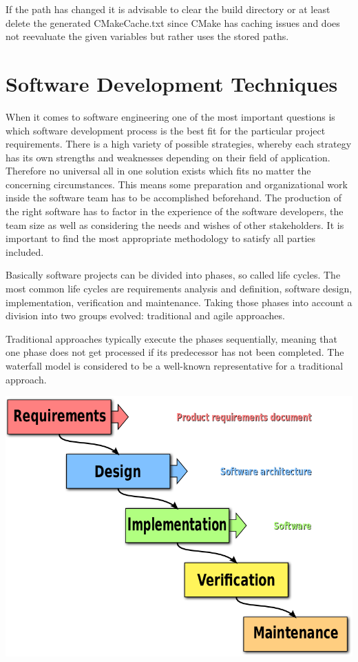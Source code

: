 {If the path has changed it is advisable to clear the build directory or
at least delete the generated CMakeCache.txt since CMake has caching
issues and does not reevaluate the given variables but rather uses the
stored paths. }

\hypertarget{h.totk00jqaso2}{\section{\texorpdfstring{{Software
Development
}{Techniques}}{Software Development Techniques}}\label{h.totk00jqaso2}}

{When it comes to software engineering one of the most important
questions is which software development process is the best fit for the
particular project requirements. There is a high variety of possible
strategies, whereby each strategy has its own strengths and weaknesses
depending on their field of application. Therefore no universal all in
one solution exists which fits no matter the concerning circumstances.
This means some preparation and organizational work inside the software
team has to be accomplished beforehand. The production of the right
software has to factor in the experience of the software developers, the
team size as well as considering the needs and wishes of other
stakeholders. It is important to find the most appropriate methodology
to satisfy all parties included.}

{Basically software projects can be divided into phases, so called life
cycles. The most common life cycles are requirements analysis and
definition, software design, implementation, verification and
maintenance. Taking those phases into account a division into two groups
evolved: traditional and agile approaches.}

{Traditional approaches typically execute the phases sequentially,
meaning that one phase does not get processed if its predecessor has not
been completed. The waterfall model is considered to be a well-known
representative for a traditional approach.}

{}

{\includegraphics{images/image05.png}}

